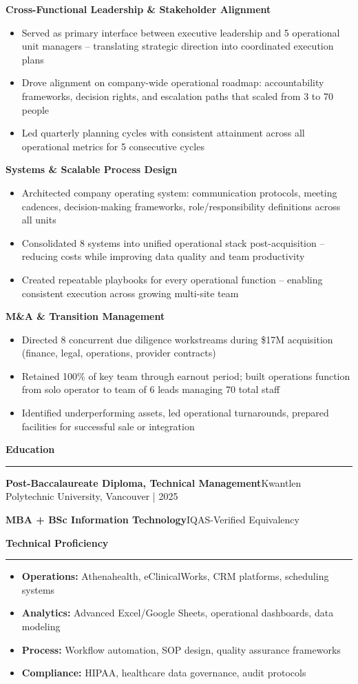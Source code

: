 \documentclass[10pt,letterpaper]{article}
\newcommand{\sections}[1]{{\vspace{8pt}\textbf{\large #1}\vspace{4pt}\hrule\vspace{4pt}}}
\newcommand{\company}[2]{{\textbf{#1}\hfill#2\par}}
\begin{document}
\textbf{Cross-Functional Leadership \& Stakeholder Alignment}
\begin{itemize}
  \item Served as primary interface between executive leadership and 5 operational unit managers -- translating strategic direction into coordinated execution plans
  \item Drove alignment on company-wide operational roadmap: accountability frameworks, decision rights, and escalation paths that scaled from 3 to 70 people
  \item Led quarterly planning cycles with consistent attainment across all operational metrics for 5 consecutive cycles
\end{itemize}

\textbf{Systems \& Scalable Process Design}
\begin{itemize}
  \item Architected company operating system: communication protocols, meeting cadences, decision-making frameworks, role/responsibility definitions across all units
  \item Consolidated 8 systems into unified operational stack post-acquisition -- reducing costs while improving data quality and team productivity
  \item Created repeatable playbooks for every operational function -- enabling consistent execution across growing multi-site team
\end{itemize}

\textbf{M\&A \& Transition Management}
\begin{itemize}
  \item Directed 8 concurrent due diligence workstreams during \$17M acquisition (finance, legal, operations, provider contracts)
  \item Retained 100\% of key team through earnout period; built operations function from solo operator to team of 6 leads managing 70 total staff
  \item Identified underperforming assets, led operational turnarounds, prepared facilities for successful sale or integration
\end{itemize}

\sections{Education}

\company{Post-Baccalaureate Diploma, Technical Management}{Kwantlen Polytechnic University, Vancouver | 2025}
\company{MBA + BSc Information Technology}{IQAS-Verified Equivalency}

\sections{Technical Proficiency}

\begin{itemize}
  \item \textbf{Operations:} Athenahealth, eClinicalWorks, CRM platforms, scheduling systems
  \item \textbf{Analytics:} Advanced Excel/Google Sheets, operational dashboards, data modeling
  \item \textbf{Process:} Workflow automation, SOP design, quality assurance frameworks
  \item \textbf{Compliance:} HIPAA, healthcare data governance, audit protocols
\end{itemize}
\end{document}
